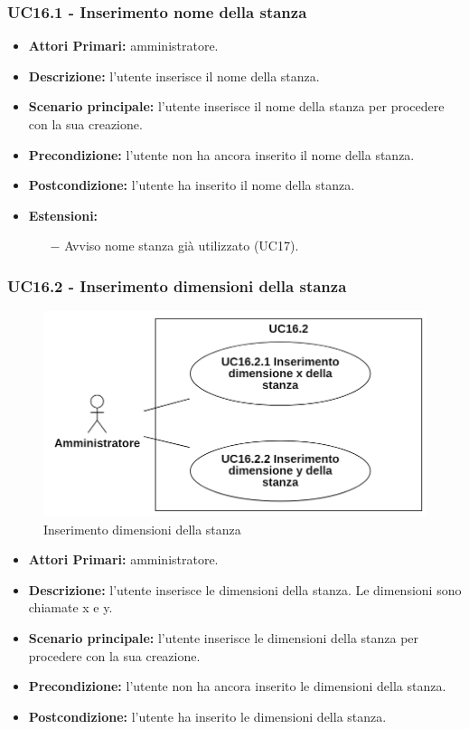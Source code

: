 \subsubsection{ UC16.1 - Inserimento nome della stanza}
\begin{itemize}
	\item\textbf{Attori Primari:}
	amministratore.
	\item\textbf{Descrizione:} 
	l'utente inserisce il nome della stanza.
	\item\textbf{Scenario principale:} 
	l'utente inserisce il nome della stanza per procedere con la sua creazione.
	\item\textbf{Precondizione:} 
	l'utente non ha ancora inserito il nome della stanza.
	\item\textbf{Postcondizione:}
	l'utente ha inserito il nome della stanza.
	\item\textbf{Estensioni:}
	\begin{itemize}
		\item[$-$] Avviso nome stanza già utilizzato (UC17).
	\end{itemize}
\end{itemize}
\subsubsection{ UC16.2 - Inserimento dimensioni della stanza}
\begin{figure}[H]
	\centering
	\includegraphics[width=12cm]{res/images/UC16.2.png}
	\caption{Inserimento dimensioni della stanza}
\end{figure}
\begin{itemize}
	\item\textbf{Attori Primari:}
	amministratore.
	\item\textbf{Descrizione:} 
	l'utente inserisce le dimensioni della stanza. Le dimensioni sono chiamate x e y.
	\item\textbf{Scenario principale:} 
	l'utente inserisce le dimensioni della stanza per procedere con la sua creazione.
	\item\textbf{Precondizione:} 
	l'utente non ha ancora inserito le dimensioni della stanza.
	\item\textbf{Postcondizione:}
	l'utente ha inserito le dimensioni della stanza.
\end{itemize}
